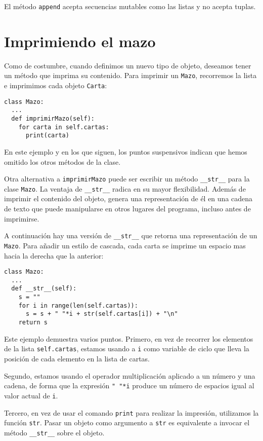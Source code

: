 El método \texttt{append} acepta secuencias mutables como las listas
y no acepta tuplas.

  

\section{Imprimiendo el mazo}

\label{printdeck} 

Como de costumbre, cuando definimos un nuevo tipo de objeto, deseamos
tener un método que imprima su contenido. Para imprimir un \texttt{Mazo},
recorremos la lista e imprimimos cada objeto \texttt{Carta}:
\begin{verbatim}
class Mazo:
  ...
  def imprimirMazo(self):
    for carta in self.cartas:
      print(carta)
\end{verbatim}

En este ejemplo y en los que siguen, los puntos suspensivos indican
que hemos omitido los otros métodos de la clase.

Otra alternativa a \texttt{imprimirMazo} puede ser escribir un método
\texttt{\_\_str\_\_} para la clase \texttt{Mazo}. La ventaja de \texttt{\_\_str\_\_}
radica en su mayor flexibilidad. Además de imprimir el contenido del
objeto, genera una representación de él en una cadena de texto que
puede manipularse en otros lugares del programa, incluso antes de
imprimirse.

A continuación hay una versión de \texttt{\_\_str\_\_} que retorna
una representación de un \texttt{Mazo}. Para añadir un estilo de cascada,
cada carta se imprime un espacio mas hacia la derecha que la anterior:
\begin{verbatim}
class Mazo:
  ...
  def __str__(self):
    s = ""
    for i in range(len(self.cartas)):
      s = s + " "*i + str(self.cartas[i]) + "\n"
    return s
\end{verbatim}

Este ejemplo demuestra varios puntos. Primero, en vez de recorrer
los elementos de la lista \texttt{self.cartas}, estamos usando a \texttt{i}
como variable de ciclo que lleva la posición de cada elemento en la
lista de cartas.

Segundo, estamos usando el operador multiplicación aplicado a un número
y una cadena, de forma que la expresión \verb+" "*i+ produce un número
de espacios igual al valor actual de \texttt{i}.

Tercero, en vez de usar el comando \texttt{print} para realizar la
impresión, utilizamos la función \texttt{str}. Pasar un objeto como
argumento a \texttt{str} es equivalente a invocar el método \texttt{\_\_str\_\_}
sobre el objeto.

